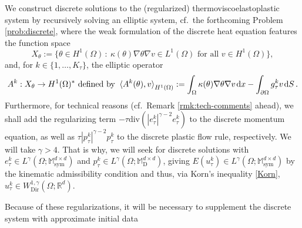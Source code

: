 \documentclass[a4paper,10pt,reqno]{amsart}
\numberwithin{equation}{section}
\newcommand{\bbM}{\mathbb{M}}
\newcommand{\R}{\mathbb{R}}
\numberwithin{equation}{section}
\def\dd{\;\!\mathrm{d}} %
\newcommand{\pairing}[4]{ \sideset{_{ #1 }}{_{ #2 }}  {\mathop{\langle #3 , #4
\rangle}}}
\newcommand{\sig}[1]{E(#1)}
\newcommand{\Dir}{\mathrm{Dir}}
\newcommand{\mt}{\bbM}
\newcommand{\sym}{\mathrm{sym}}
\newcommand{\dev}{\mathrm{D}}
\newcommand{\condu}{\kappa}
\newcommand{\As}{A_{\mathrm{s}}}
\newcommand{\ass}{a_{\mathrm{s}}}
\newcommand{\spt}{X_\theta}
\newcommand{\gtau}[1]{g_\tau^{#1}}
\newcommand{\utau}[1]{u_\tau^{#1}}
\newcommand{\ptau}[1]{p_\tau^{#1}}
\newcommand{\ztau}[1]{z_\tau^{#1}}
\newcommand{\etau}[1]{e_\tau^{#1}}
\begin{document}
\par
We construct discrete solutions to the (regularized) thermoviscoelastoplastic system   by recursively solving an elliptic system,  cf.\ the forthcoming Problem 
\ref{prob:discrete}, where the weak formulation of the discrete heat equation features the function space
 \begin{equation}
\label{X-space}
 \spt:= \{ \theta  \in H^1(\Omega)\, : \   \condu(\theta) \nabla \theta  \nabla v  \in L^1(\Omega)   \text{ for all } v \in H^1 (\Omega)\},
 \end{equation}
 and, for $k \in \{1,\ldots, K_\tau\}$,  the elliptic operator
 \begin{equation}
 \label{elliptic-k}
 {A}^k: \spt  \to  H^1(\Omega)^* \text{  defined by }\\
\pairing{}{H^1(\Omega)}{ {A}^k(\theta) }{v}:=
  \int_\Omega \condu(\theta) \nabla \theta \nabla v \dd x - \int_{\partial \Omega} \gtau{k} v \dd S\,.
\end{equation} 
Furthermore, for technical reasons (cf.\ Remark \ref{rmk:tech-comments} ahead), we shall  
 add the regularizing term
$-\tau \mathrm{div}(|\etau k|^{\gamma- 2} \etau k)$ to the discrete momentum equation, %
 as well as  $\tau |\ptau k|^{\gamma-2} \ptau k$ to the discrete  plastic flow rule, respectively. We will take   $\gamma>4$. 
 That is why, we will seek for discrete solutions with  $\etau k\in L^{\gamma} (\Omega;\mt_{\sym}^{d\times d}) $ 
  and $\ptau k  \in L^{\gamma} (\Omega;  \mt_{\dev}^{d\times d})$,  
  giving $\sig{\utau{k}} \in  L^{\gamma} (\Omega;\mt_{\sym}^{d\times d})$  by the kinematic admissibility condition and thus, via Korn's inequality
   \eqref{Korn}, $\utau k \in W_\Dir^{1,\gamma} (\Omega;\R^d)$.
   \par
     Because of these regularizations, it will be necessary to supplement the discrete system with  approximate initial data
\end{document}
